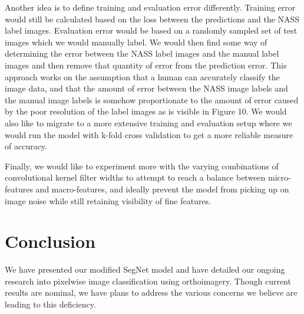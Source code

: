 \documentclass[12pt]{article}
\begin{document}
Another idea is to define training and evaluation error differently. Training error would still be calculated based on the loss between the predictions and the NASS label images. Evaluation error would be based on a randomly sampled set of test images which we would manually label. We would then find some way of determining the error between the NASS label images and the manual label images and then remove that quantity of error from the prediction error. This approach works on the assumption that a human can accurately classify the image data, and that the amount of error between the NASS image labels and the manual image labels is somehow proportionate to the amount of error caused by the poor resolution of the label images as is visible in Figure 10.
We would also like to migrate to a more extensive training and evaluation setup where we would run the model with k-fold cross validation to get a more reliable measure of accuracy.

Finally, we would like to experiment more with the varying combinations of convolutional kernel filter widths to attempt to reach a balance between micro-features and macro-features, and ideally prevent the model from picking up on image noise while still retaining visibility of fine features. 

\section{Conclusion}

We have presented our modified SegNet model and have detailed our ongoing research into pixelwise image classification using orthoimagery. Though current results are nominal, we have plans to address the various concerns we believe are leading to this deficiency.
 


\end{document}
